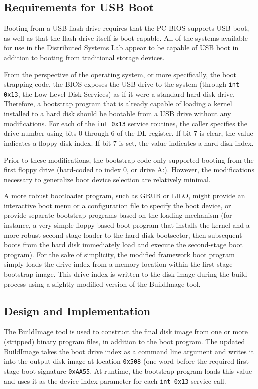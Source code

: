 \documentclass[titlepage]{article}
\begin{document}
\subsection{Requirements for USB Boot}

Booting from a USB flash drive requires that the PC BIOS supports USB boot, as
well as that the flash drive itself is boot-capable. All of the systems
available for use in the Distributed Systems Lab appear to be capable of USB
boot in addition to booting from traditional storage devices.

From the perspective of the operating system, or more specifically, the boot
strapping code, the BIOS exposes the USB drive to the system (through
\verb!int 0x13!, the Low Level Disk Services) as if it were a standard hard
disk drive.  Therefore, a bootstrap program that is already capable of loading a
kernel installed to a hard disk should be bootable from a USB drive without any
modifications. For each of the \verb!int 0x13! service routines, the caller
specifies the drive number using bits 0 through 6 of the DL register. If bit 7
is clear, the value indicates a floppy disk index. If bit 7 is set, the value
indicates a hard disk index.

Prior to these modifications, the bootstrap code only supported booting from
the first floppy drive (hard-coded to index 0, or drive A:). However, the 
modifications necessary to generalize boot device selection are relatively
minimal.

A more robust bootloader program, such as GRUB or LILO, might provide an
interactive boot menu or a configuration file to specify the boot device, or
provide separate bootstrap programs based on the loading mechanism (for
instance, a very simple floppy-based boot program that installs the kernel and
a more robust second-stage loader to the hard disk bootsector, then subsequent
boots from the hard disk immediately load and execute the second-stage boot
program). For the sake of simplicity, the modified framework boot program simply
loads the drive index from a memory location within the first-stage bootstrap
image.  This drive index is written to the disk image during the build process
using a slightly modified version of the BuildImage tool.

\subsection{Design and Implementation}

The BuildImage tool is used to construct the final disk image from one or more
(stripped) binary program files, in addition to the boot program. The updated
BuildImage takes the boot drive index as a command line argument and writes
it into the output disk image at location \verb!0x508! (one word before the
required first-stage boot signature \verb!0xAA55!. At runtime, the bootstrap
program loads this value and uses it as the device index parameter for each
\verb!int 0x13! service call.
\end{document}
